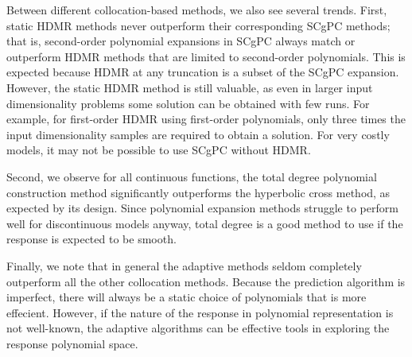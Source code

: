 Between different collocation-based methods, we also see several trends.  First, static HDMR methods never outperform their
corresponding SCgPC methods; that is, second-order polynomial expansions in SCgPC always match or outperform HDMR methods
that are limited to second-order polynomials.  This is expected because HDMR at any truncation is a subset of the SCgPC
expansion.  However, the static HDMR method is still valuable, as even in larger input dimensionality problems some solution
can be obtained with few runs.  For example, for first-order HDMR using first-order polynomials, only three times the input
dimensionality samples are required to obtain a solution.  For very costly models, it may not be possible to use SCgPC without
HDMR.

Second, we observe for all continuous functions, the total degree polynomial construction method significantly outperforms
the hyperbolic cross method, as expected by its design.  Since polynomial expansion methods struggle to perform well for
discontinuous models anyway, total degree is a good method to use if the response is expected to be smooth.

Finally, we note that in general the adaptive methods seldom completely outperform all the other collocation methods.  Because the
prediction algorithm is imperfect, there will always be a static choice of polynomials that is more effecient.  However, if
the nature of the response in polynomial representation is not well-known, the adaptive algorithms can be effective tools in
exploring the response polynomial space.

